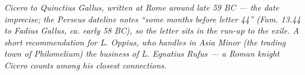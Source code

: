 
\textit{Cicero to Quinctius Gallus, written at Rome around late
59 BC --- the date imprecise; the Perseus dateline notes
``some months before letter 44'' (Fam. 13.44 to Fadius Gallus,
ca. early 58 BC), so the letter sits in the run-up to the
exile. A short recommendation for L. Oppius, who handles in
Asia Minor (the trading town of Philomelium) the business of
L. Egnatius Rufus --- a Roman knight Cicero counts among his
closest connections.}
